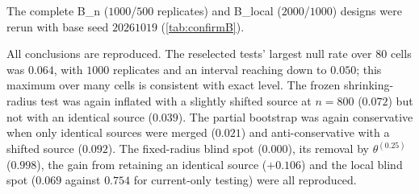 The complete B\_n ($1000$/$500$ replicates) and B\_local ($2000$/$1000$) designs were rerun with base seed $20261019$ (\cref{tab:confirmB}).

\begin{table}[H]
\centering\scriptsize
\caption{Key quantities in the exploratory and the independent confirmation runs, with Wilson 95\% intervals (rates) or paired normal 95\% intervals (differences). The first row is the largest null rejection rate of any reselected radius test over $4$ settings, $5$ sample sizes and $4$ schedules.}\label{tab:confirmB}

\end{table}

All conclusions are reproduced. The reselected tests' largest null rate over $80$ cells was $0.064$, with $1000$ replicates and an interval reaching down to $0.050$; this maximum over many cells is consistent with exact level. The frozen shrinking-radius test was again inflated with a slightly shifted source at $n=800$ ($0.072$) but not with an identical source ($0.039$). The partial bootstrap was again conservative when only identical sources were merged ($0.021$) and anti-conservative with a shifted source ($0.092$). The fixed-radius blind spot ($0.000$), its removal by $\theta^{(0.25)}$ ($0.998$), the gain from retaining an identical source ($+0.106$) and the local blind spot ($0.069$ against $0.754$ for current-only testing) were all reproduced.
